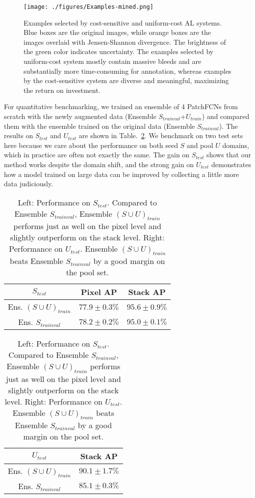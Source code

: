 \documentclass{llncs}
\begin{document}
\begin{figure}[t]
    \centering
    \texttt{[image: ./figures/Examples-mined.png]}
    \caption{Examples selected by cost-sensitive and uniform-cost AL systems. Blue boxes are the original images, while orange boxes are the images overlaid with Jensen-Shannon divergence. The brightness of the green color indicates uncertainty. The examples selected by uniform-cost system mostly contain massive bleeds and are substantially more time-consuming for annotation, whereas examples by the cost-sensitive system are diverse and meaningful, maximizing the return on investment.}
    \label{fig:examples-mined}
    \vspace*{-0.5cm}
\end{figure}

For quantitative benchmarking, we trained an ensemble of 4 PatchFCNs from scratch with the newly augmented data (Ensemble $S_{trainval}$+$U_{train}$) and compared them with the ensemble trained on the original data (Ensemble $S_{trainval}$). The results on $S_{test}$ and $U_{test}$ are shown in Table.~\ref{table:unlabel}. We benchmark on two test sets here because we care about the performance on both seed $S$ and pool $U$ domains, which in practice are often not exactly the same. The gain on $S_{test}$ shows that our method works despite the domain shift, and the strong gain on $U_{test}$ demonstrates how a model trained on large data can be improved by collecting a little more data judiciously. 
\begin{table}[t]
     \centering
     \def\arraystretch{1.25}\tabcolsep=3pt
     \begin{tabular}{|c | c c |} 
     \hline
     $S_{test}$ & Pixel AP & Stack AP\\
     \hline\hline
     Ens. $(S \cup U)_{train}$	& $77.9 \pm 0.3\%$ & $\mathbf{95.6 \pm 0.9\%}$\\
     \hline
     Ens. $S_{trainval}$ & $\mathbf{78.2 \pm 0.2\%}$ & $95.0 \pm 0.1\%$ \\
     \hline
     \end{tabular}
     \begin{tabular}{|c | c |} 
     \hline
     $U_{test}$ & Stack AP\\
     \hline\hline
     Ens. $(S \cup U)_{train}$	& $\mathbf{90.1 \pm 1.7\%}$ \\
     \hline
     Ens. $S_{trainval}$ & $85.1 \pm 0.3\%$ \\
     \hline
     \end{tabular}         
    \caption{Left: Performance on $S_{test}$. Compared to Ensemble $S_{trainval}$, Ensemble $(S \cup U)_{train}$ performs just as well on the pixel level and slightly outperform on the stack level. Right: Performance on $U_{test}$. Ensemble $(S \cup U)_{train}$ beats Ensemble $S_{trainval}$ by a good margin on the pool set.}
    \label{table:unlabel}
    \vspace*{-0.8cm}
\end{table}
\end{document}
